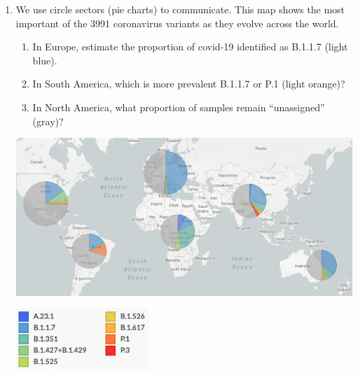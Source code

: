 \begin{enumerate}
\item We use circle sectors (pie charts) to communicate. This map shows the most important of the 3991 coronavirus variants as they evolve across the world.
\begin{enumerate}[itemsep=0.7cm]
  \item In Europe, estimate the proportion of covid-19 identified as B.1.1.7 (light blue).
  \item In South America, which is more prevalent B.1.1.7 or P.1 (light orange)?
  \item In North America, what proportion of samples remain ``unassigned'' (gray)?
\end{enumerate}
  \begin{center}
    \includegraphics[width=18cm]{../graphics/11Covid_map.png}
  \end{center}
  \begin{flushright}
    \includegraphics[width=5cm]{../graphics/11Covid_map_legend.png}
  \end{flushright}




\end{enumerate}
